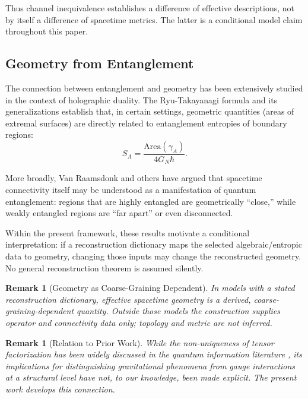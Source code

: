 \documentclass[12pt,a4paper,openany]{book}
\newtheorem{remark}[theorem]{Remark}
\begin{document}
Thus channel inequivalence establishes a difference of effective descriptions, not by itself a difference of spacetime metrics.  The latter is a conditional model claim throughout this paper.

\subsection{Geometry from Entanglement}

The connection between entanglement and geometry has been extensively studied in the context of holographic duality. The Ryu-Takayanagi formula \cite{RyuTakayanagi2006} and its generalizations establish that, in certain settings, geometric quantities (areas of extremal surfaces) are directly related to entanglement entropies of boundary regions:
\begin{equation}
S_A = \frac{\text{Area}(\gamma_A)}{4 G_N \hbar}.
\end{equation}

More broadly, Van Raamsdonk \cite{VanRaamsdonk2010} and others have argued that spacetime connectivity itself may be understood as a manifestation of quantum entanglement: regions that are highly entangled are geometrically ``close,'' while weakly entangled regions are ``far apart'' or even disconnected.

Within the present framework, these results motivate a conditional interpretation: if a reconstruction dictionary maps the selected algebraic/entropic data to geometry, changing those inputs may change the reconstructed geometry.  No general reconstruction theorem is assumed silently.

\begin{remark}[Geometry as Coarse-Graining Dependent]
In models with a stated reconstruction dictionary, effective spacetime geometry is a derived, coarse-graining-dependent quantity.  Outside those models the construction supplies operator and connectivity data only; topology and metric are not inferred.
\end{remark}

\begin{remark}[Relation to Prior Work]
While the non-uniqueness of tensor factorization has been widely discussed in the quantum information literature \cite{Zanardi2001,Zanardi2004}, its implications for distinguishing gravitational phenomena from gauge interactions at a structural level have not, to our knowledge, been made explicit. The present work develops this connection.
\end{remark}
\end{document}
